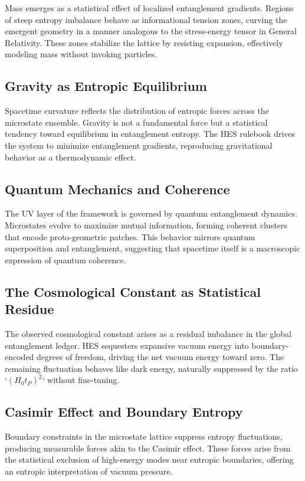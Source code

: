 \documentclass[12pt]{article}
\begin{document}
Mass emerges as a statistical effect of localized entanglement gradients. Regions of steep entropy imbalance behave as informational tension zones, curving the emergent geometry in a manner analogous to the stress-energy tensor in General Relativity. These zones stabilize the lattice by resisting expansion, effectively modeling mass without invoking particles.

\subsection{Gravity as Entropic Equilibrium}

Spacetime curvature reflects the distribution of entropic forces across the microstate ensemble. Gravity is not a fundamental force but a statistical tendency toward equilibrium in entanglement entropy. The HES rulebook drives the system to minimize entanglement gradients, reproducing gravitational behavior as a thermodynamic effect.

\subsection{Quantum Mechanics and Coherence}

The UV layer of the framework is governed by quantum entanglement dynamics. Microstates evolve to maximize mutual information, forming coherent clusters that encode proto-geometric patches. This behavior mirrors quantum superposition and entanglement, suggesting that spacetime itself is a macroscopic expression of quantum coherence.

\subsection{The Cosmological Constant as Statistical Residue}

The observed cosmological constant arises as a residual imbalance in the global entanglement ledger. HES sequesters expansive vacuum energy into boundary-encoded degrees of freedom, driving the net vacuum energy toward zero. The remaining fluctuation behaves like dark energy, naturally suppressed by the ratio `\( (H_0 t_P)^2 \)` without fine-tuning.

\subsection{Casimir Effect and Boundary Entropy}

Boundary constraints in the microstate lattice suppress entropy fluctuations, producing measurable forces akin to the Casimir effect. These forces arise from the statistical exclusion of high-energy modes near entropic boundaries, offering an entropic interpretation of vacuum pressure.
\end{document}
